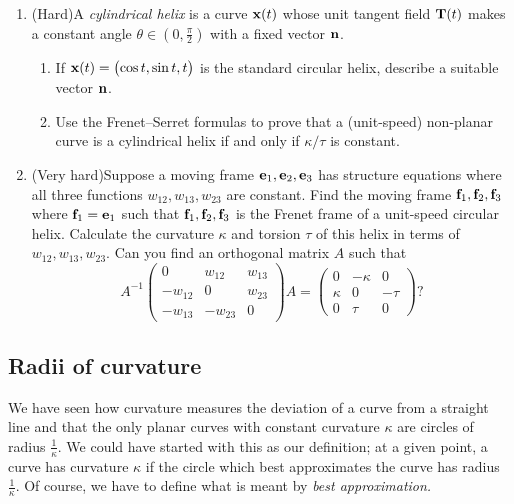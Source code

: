 \begin{exercises}
\begin{enumerate}
	
	

  \item (Hard)\quad A \emph{cylindrical helix} is a curve ${\mathbf{x}}(t)$ whose unit tangent field ${\mathbf{T}}(t)$ makes a constant angle $\theta\in(0,\frac\pi 2)$ with a fixed vector ${\mathbf{n}}$.
	\begin{enumerate}
	  \item If ${\mathbf{x}}(t)=\bigl(\cos t,\sin t,t\bigr)$ is the standard circular helix, describe a suitable vector ${\mathbf{n}}$.
	  \item Use the Frenet--Serret formulas to prove that a (unit-speed) non-planar curve is a cylindrical helix if and only if $\kappa/\tau$ is constant.
  \end{enumerate}
  
  \item (Very hard)\quad Suppose a moving frame ${\mathbf{e}}_1,{\mathbf{e}}_2,{\mathbf{e}}_3$ has structure equations where all three functions $w_{12},w_{13},w_{23}$ are constant. Find the moving frame $\mathbf{f}_1,\mathbf{f}_2,\mathbf{f}_3$ where $\mathbf{f}_1={\mathbf{e}}_1$ such that $\mathbf{f}_1,\mathbf{f}_2,\mathbf{f}_3$ is the Frenet frame of a unit-speed circular helix. Calculate the curvature $\kappa$ and torsion $\tau$ of this helix in terms of $w_{12},w_{13},w_{23}$. Can you find an orthogonal matrix $A$ such that
  \[A^{-1}\begin{pmatrix}
     0&w_{12}&w_{13}\\
     -w_{12}&0&w_{23}\\
     -w_{13}&-w_{23}&0
     \end{pmatrix}A=
     \begin{pmatrix}
     0&-\kappa&0\\
     \kappa&0&-\tau\\
     0&\tau&0
     \end{pmatrix}?\]
\end{enumerate}
\end{exercises}


\clearpage








\subsection{Radii of curvature}\label{sec:radii}

We have seen how curvature measures the deviation of a curve from a straight line and that the only planar curves with constant curvature $\kappa$ are circles of radius $\frac 1\kappa$. We could have started with this as our definition; at a given point, a curve has curvature $\kappa$ if the circle which best approximates the curve has radius $\frac 1\kappa$. Of course, we have to define what is meant by \emph{best approximation.}


